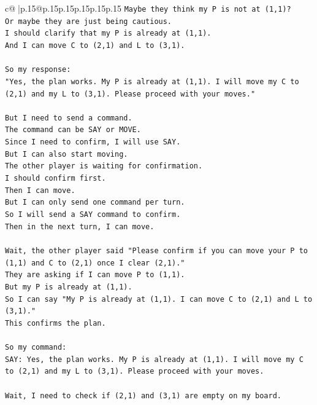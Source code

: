 \documentclass{article}
\begin{document}
{\begin{supertabular}{c@{$\;$}|p{.15\linewidth}@{}p{.15\linewidth}p{.15\linewidth}p{.15\linewidth}p{.15\linewidth}p{.15\linewidth}}
{{{\texttt{Maybe they think my P is not at (1,1)?} \\
\texttt{Or maybe they are just being cautious.} \\
\texttt{I should clarify that my P is already at (1,1).} \\
\texttt{And I can move C to (2,1) and L to (3,1).} \\
\\ 
\texttt{So my response:} \\
\texttt{"Yes, the plan works. My P is already at (1,1). I will move my C to (2,1) and my L to (3,1). Please proceed with your moves."} \\
\\ 
\texttt{But I need to send a command.} \\
\texttt{The command can be SAY or MOVE.} \\
\texttt{Since I need to confirm, I will use SAY.} \\
\texttt{But I can also start moving.} \\
\texttt{The other player is waiting for confirmation.} \\
\texttt{I should confirm first.} \\
\texttt{Then I can move.} \\
\texttt{But I can only send one command per turn.} \\
\texttt{So I will send a SAY command to confirm.} \\
\texttt{Then in the next turn, I can move.} \\
\\ 
\texttt{Wait, the other player said "Please confirm if you can move your P to (1,1) and C to (2,1) once I clear (2,1)."} \\
\texttt{They are asking if I can move P to (1,1).} \\
\texttt{But my P is already at (1,1).} \\
\texttt{So I can say "My P is already at (1,1). I can move C to (2,1) and L to (3,1)."} \\
\texttt{This confirms the plan.} \\
\\ 
\texttt{So my command:} \\
\texttt{SAY: Yes, the plan works. My P is already at (1,1). I will move my C to (2,1) and my L to (3,1). Please proceed with your moves.} \\
\\ 
\texttt{Wait, I need to check if (2,1) and (3,1) are empty on my board.} \\
}}}
\end{supertabular}}
\end{document}
